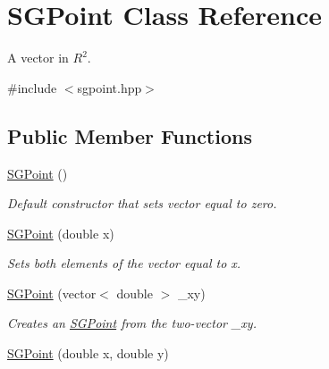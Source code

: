 \hypertarget{class_s_g_point}{\section{S\+G\+Point Class Reference}
\label{class_s_g_point}
}


A vector in $R^2$.  




{\ttfamily \#include $<$sgpoint.\+hpp$>$}

\subsection*{Public Member Functions}
\begin{DoxyCompactItemize}
\item 
\hypertarget{class_s_g_point_aa8127de54b9fae207ca43a60414a3dd8}{\hyperlink{class_s_g_point_aa8127de54b9fae207ca43a60414a3dd8}{S\+G\+Point} ()}\label{class_s_g_point_aa8127de54b9fae207ca43a60414a3dd8}

\begin{DoxyCompactList}\small\item\em Default constructor that sets vector equal to zero. \end{DoxyCompactList}\item 
\hypertarget{class_s_g_point_a3b415d48aa231cc30a49ba9aeca35665}{\hyperlink{class_s_g_point_a3b415d48aa231cc30a49ba9aeca35665}{S\+G\+Point} (double x)}\label{class_s_g_point_a3b415d48aa231cc30a49ba9aeca35665}

\begin{DoxyCompactList}\small\item\em Sets both elements of the vector equal to x. \end{DoxyCompactList}\item 
\hypertarget{class_s_g_point_a02473a7c780510203156728286a9eefc}{\hyperlink{class_s_g_point_a02473a7c780510203156728286a9eefc}{S\+G\+Point} (vector$<$ double $>$ \+\_\+xy)}\label{class_s_g_point_a02473a7c780510203156728286a9eefc}

\begin{DoxyCompactList}\small\item\em Creates an \hyperlink{class_s_g_point}{S\+G\+Point} from the two-\/vector \+\_\+xy. \end{DoxyCompactList}\item 
\hypertarget{class_s_g_point_a283f1dedd05d7f74c570625ff234892e}{\hyperlink{class_s_g_point_a283f1dedd05d7f74c570625ff234892e}{S\+G\+Point} (double x, double y)}\label{class_s_g_point_a283f1dedd05d7f74c570625ff234892e}


\end{DoxyCompactItemize}
